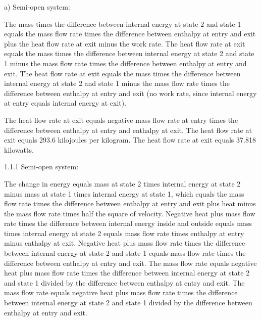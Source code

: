 a) Semi-open system:

The mass times the difference between internal energy at state 2 and state 1 equals the mass flow rate times the difference between enthalpy at entry and exit plus the heat flow rate at exit minus the work rate. 
The heat flow rate at exit equals the mass times the difference between internal energy at state 2 and state 1 minus the mass flow rate times the difference between enthalpy at entry and exit.
The heat flow rate at exit equals the mass times the difference between internal energy at state 2 and state 1 minus the mass flow rate times the difference between enthalpy at entry and exit (no work rate, since internal energy at entry equals internal energy at exit).

The heat flow rate at exit equals negative mass flow rate at entry times the difference between enthalpy at entry and enthalpy at exit.
The heat flow rate at exit equals 293.6 kilojoules per kilogram.
The heat flow rate at exit equals 37.818 kilowatts.

1.1.1 Semi-open system:

The change in energy equals mass at state 2 times internal energy at state 2 minus mass at state 1 times internal energy at state 1, which equals the mass flow rate times the difference between enthalpy at entry and exit plus heat minus the mass flow rate times half the square of velocity.
Negative heat plus mass flow rate times the difference between internal energy inside and outside equals mass times internal energy at state 2 equals mass flow rate times enthalpy at entry minus enthalpy at exit.
Negative heat plus mass flow rate times the difference between internal energy at state 2 and state 1 equals mass flow rate times the difference between enthalpy at entry and exit.
The mass flow rate equals negative heat plus mass flow rate times the difference between internal energy at state 2 and state 1 divided by the difference between enthalpy at entry and exit.
The mass flow rate equals negative heat plus mass flow rate times the difference between internal energy at state 2 and state 1 divided by the difference between enthalpy at entry and exit.